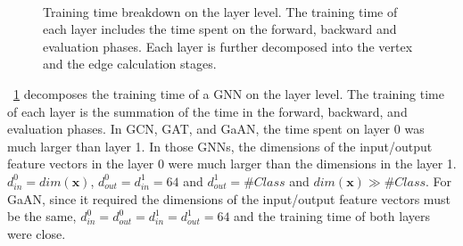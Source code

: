 \begin{figure}
    \centering
    \\
    \caption{Training time breakdown on the layer level. The training time of each layer includes the time spent on the forward, backward and evaluation phases. Each layer is further decomposed into the vertex and the edge calculation stages.}
    \label{fig:exp_vertex_edge_cal_proportion}
\end{figure}

\figurename~\ref{fig:exp_vertex_edge_cal_proportion} decomposes the training time of a GNN on the layer level.
The training time of each layer is the summation of the time in the forward, backward, and evaluation phases.
In GCN, GAT, and GaAN, the time spent on layer 0 was much larger than layer 1.
In those GNNs, the dimensions of the input/output feature vectors in the layer 0 were much larger than the dimensions in the layer 1.
$d^0_{in}=dim(\boldsymbol{x})$, $d^0_{out}=d^1_{in}=64$ and $d^1_{out}=\#Class$ and $dim(\boldsymbol{x}) \gg \#Class$.
For GaAN, since it required the dimensions of the input/output feature vectors must be the same, $d^0_{in}=d^0_{out}=d^1_{in}=d^1_{out}=64$ and the training time of both layers were close.

